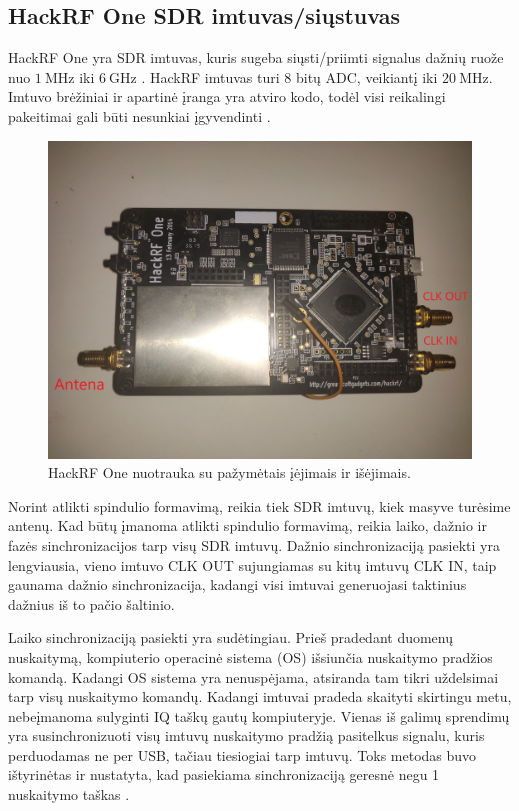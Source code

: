 \documentclass[main.tex]{subfiles}
\begin{document}
\subsection{HackRF One SDR imtuvas/siųstuvas}\label{sec:hackrf}

HackRF One yra SDR imtuvas, kuris sugeba siųsti/priimti signalus dažnių ruože nuo
$1\ \mathrm{MHz}$ iki $6\ \mathrm{GHz}$ \cite{hackrf_one}.
HackRF imtuvas turi 8 bitų ADC, veikiantį iki $20\ \mathrm{MHz}$.
Imtuvo brėžiniai ir apartinė įranga yra atviro kodo, todėl visi
reikalingi pakeitimai gali būti nesunkiai įgyvendinti \cite{hackrf_github}.

\begin{figure}[h]
    \begin{centering}
    \includegraphics[scale=0.1]{drawings/hackrf_img}
    \par\end{centering}
    \protect\caption{\label{fig:hackrf_img}HackRF One nuotrauka su pažymėtais įėjimais ir išėjimais.}
\end{figure}

Norint atlikti spindulio formavimą, reikia tiek SDR imtuvų, kiek masyve
turėsime antenų. Kad būtų įmanoma atlikti spindulio formavimą, reikia laiko, dažnio ir fazės
sinchronizacijos tarp visų SDR imtuvų.
Dažnio sinchronizaciją pasiekti yra lengviausia, vieno imtuvo CLK OUT sujungiamas su
kitų imtuvų CLK IN, taip gaunama dažnio sinchronizacija, kadangi
visi imtuvai generuojasi taktinius dažnius iš to pačio šaltinio.

Laiko sinchronizaciją pasiekti yra sudėtingiau. Prieš pradedant duomenų nuskaitymą,
kompiuterio operacinė sistema (OS) išsiunčia nuskaitymo pradžios komandą.
Kadangi OS sistema yra nenuspėjama, atsiranda tam tikri uždelsimai tarp
visų nuskaitymo komandų. Kadangi imtuvai pradeda skaityti skirtingu metu,
nebeįmanoma sulyginti IQ taškų gautų kompiuteryje. Vienas iš galimų sprendimų
yra susinchronizuoti visų imtuvų nuskaitymo pradžią pasitelkus signalu,
kuris perduodamas ne per USB, tačiau tiesiogiai tarp imtuvų.
Toks metodas buvo ištyrinėtas ir nustatyta, kad pasiekiama sinchronizaciją
geresnė negu 1 nuskaitymo taškas \cite{hackrf_sync}.
\end{document}
